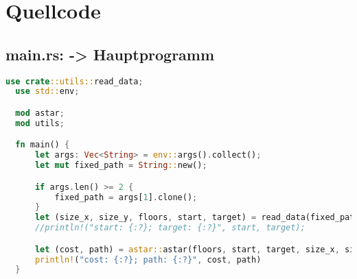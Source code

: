 \section{Quellcode}
\subsection{main.rs: -> Hauptprogramm}

\begin{lstlisting}[language=Rust, style=colouredRust]
  use crate::utils::read_data;
  use std::env;

  mod astar;
  mod utils;

  fn main() {
      let args: Vec<String> = env::args().collect();
      let mut fixed_path = String::new();

      if args.len() >= 2 {
          fixed_path = args[1].clone();
      }
      let (size_x, size_y, floors, start, target) = read_data(fixed_path);
      //println!("start: {:?}; target: {:?}", start, target);

      let (cost, path) = astar::astar(floors, start, target, size_x, size_y);
      println!("cost: {:?}; path: {:?}", cost, path)
  }
\end{lstlisting}

